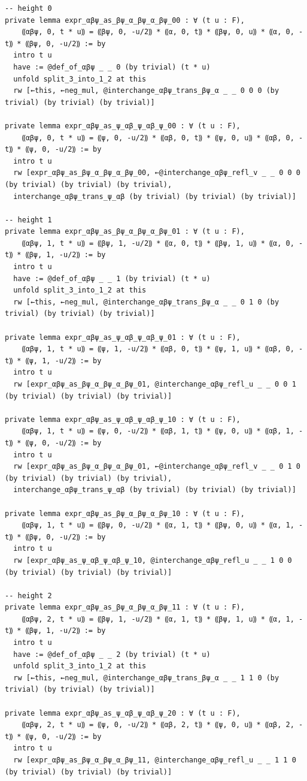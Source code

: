 \documentclass[10pt,a4paper]{article}
\begin{document}
\begin{Verbatim}
-- height 0
private lemma expr_αβψ_as_βψ_α_βψ_α_βψ_00 : ∀ (t u : F),
    ⸨αβψ, 0, t * u⸩ = ⸨βψ, 0, -u/2⸩ * ⸨α, 0, t⸩ * ⸨βψ, 0, u⸩ * ⸨α, 0, -t⸩ * ⸨βψ, 0, -u/2⸩ := by
  intro t u
  have := @def_of_αβψ _ _ 0 (by trivial) (t * u)
  unfold split_3_into_1_2 at this
  rw [←this, ←neg_mul, @interchange_αβψ_trans_βψ_α _ _ 0 0 0 (by trivial) (by trivial) (by trivial)]

private lemma expr_αβψ_as_ψ_αβ_ψ_αβ_ψ_00 : ∀ (t u : F),
    ⸨αβψ, 0, t * u⸩ = ⸨ψ, 0, -u/2⸩ * ⸨αβ, 0, t⸩ * ⸨ψ, 0, u⸩ * ⸨αβ, 0, -t⸩ * ⸨ψ, 0, -u/2⸩ := by
  intro t u
  rw [expr_αβψ_as_βψ_α_βψ_α_βψ_00, ←@interchange_αβψ_refl_v _ _ 0 0 0 (by trivial) (by trivial) (by trivial),
  interchange_αβψ_trans_ψ_αβ (by trivial) (by trivial) (by trivial)]

-- height 1
private lemma expr_αβψ_as_βψ_α_βψ_α_βψ_01 : ∀ (t u : F),
    ⸨αβψ, 1, t * u⸩ = ⸨βψ, 1, -u/2⸩ * ⸨α, 0, t⸩ * ⸨βψ, 1, u⸩ * ⸨α, 0, -t⸩ * ⸨βψ, 1, -u/2⸩ := by
  intro t u
  have := @def_of_αβψ _ _ 1 (by trivial) (t * u)
  unfold split_3_into_1_2 at this
  rw [←this, ←neg_mul, @interchange_αβψ_trans_βψ_α _ _ 0 1 0 (by trivial) (by trivial) (by trivial)]

private lemma expr_αβψ_as_ψ_αβ_ψ_αβ_ψ_01 : ∀ (t u : F),
    ⸨αβψ, 1, t * u⸩ = ⸨ψ, 1, -u/2⸩ * ⸨αβ, 0, t⸩ * ⸨ψ, 1, u⸩ * ⸨αβ, 0, -t⸩ * ⸨ψ, 1, -u/2⸩ := by
  intro t u
  rw [expr_αβψ_as_βψ_α_βψ_α_βψ_01, @interchange_αβψ_refl_u _ _ 0 0 1 (by trivial) (by trivial) (by trivial)]

private lemma expr_αβψ_as_ψ_αβ_ψ_αβ_ψ_10 : ∀ (t u : F),
    ⸨αβψ, 1, t * u⸩ = ⸨ψ, 0, -u/2⸩ * ⸨αβ, 1, t⸩ * ⸨ψ, 0, u⸩ * ⸨αβ, 1, -t⸩ * ⸨ψ, 0, -u/2⸩ := by
  intro t u
  rw [expr_αβψ_as_βψ_α_βψ_α_βψ_01, ←@interchange_αβψ_refl_v _ _ 0 1 0 (by trivial) (by trivial) (by trivial),
  interchange_αβψ_trans_ψ_αβ (by trivial) (by trivial) (by trivial)]

private lemma expr_αβψ_as_βψ_α_βψ_α_βψ_10 : ∀ (t u : F),
    ⸨αβψ, 1, t * u⸩ = ⸨βψ, 0, -u/2⸩ * ⸨α, 1, t⸩ * ⸨βψ, 0, u⸩ * ⸨α, 1, -t⸩ * ⸨βψ, 0, -u/2⸩ := by
  intro t u
  rw [expr_αβψ_as_ψ_αβ_ψ_αβ_ψ_10, @interchange_αβψ_refl_u _ _ 1 0 0 (by trivial) (by trivial) (by trivial)]

-- height 2
private lemma expr_αβψ_as_βψ_α_βψ_α_βψ_11 : ∀ (t u : F),
    ⸨αβψ, 2, t * u⸩ = ⸨βψ, 1, -u/2⸩ * ⸨α, 1, t⸩ * ⸨βψ, 1, u⸩ * ⸨α, 1, -t⸩ * ⸨βψ, 1, -u/2⸩ := by
  intro t u
  have := @def_of_αβψ _ _ 2 (by trivial) (t * u)
  unfold split_3_into_1_2 at this
  rw [←this, ←neg_mul, @interchange_αβψ_trans_βψ_α _ _ 1 1 0 (by trivial) (by trivial) (by trivial)]

private lemma expr_αβψ_as_ψ_αβ_ψ_αβ_ψ_20 : ∀ (t u : F),
    ⸨αβψ, 2, t * u⸩ = ⸨ψ, 0, -u/2⸩ * ⸨αβ, 2, t⸩ * ⸨ψ, 0, u⸩ * ⸨αβ, 2, -t⸩ * ⸨ψ, 0, -u/2⸩ := by
  intro t u
  rw [expr_αβψ_as_βψ_α_βψ_α_βψ_11, @interchange_αβψ_refl_u _ _ 1 1 0 (by trivial) (by trivial) (by trivial)]


\end{Verbatim}
\end{document}
